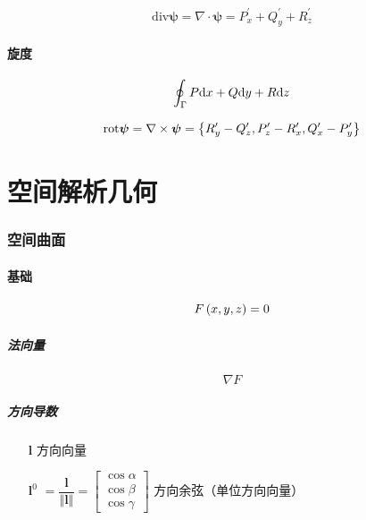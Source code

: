 \documentclass{article}
\begin{document}
\begin{theorem}[散度]
    \[\mathrm{div}\boldsymbol\psi=
        \nabla\cdot\boldsymbol\psi=
        P_x^\prime+Q_y^\prime+R_z^\prime\]
\end{theorem}

\subsection{旋度}

\begin{definition}
    \[\oint_\Gamma P\mathrm d x+Q\mathrm d y+R \mathrm d z\]
\end{definition}

\begin{theorem}[旋度]
    \[\mathrm{rot}\boldsymbol\psi=
        \nabla\times\boldsymbol\psi=\left\{
            R_y^\prime-Q_z^\prime,
            P_z^\prime-R_x^\prime,
            Q_x^\prime-P_y^\prime\right\}\]
\end{theorem}

\part{空间解析几何}

\section{空间曲面}

\subsection{基础}

\begin{definition}[]
    \[F\left(x,y,z\right)=0\]
\end{definition}

\subsubsection{法向量}

\[\nabla F\]

\subsubsection{方向导数}

\begin{enumerate}
    \item[$\boldsymbol l$] 方向向量
    \item[$\boldsymbol l^0$] $=\dfrac{\boldsymbol l}{\left\Vert\boldsymbol l\right\Vert}=\begin{bmatrix}\cos\alpha\\\cos\beta\\\cos\gamma\end{bmatrix}$ 方向余弦（单位方向向量）
\end{enumerate}
\end{document}
